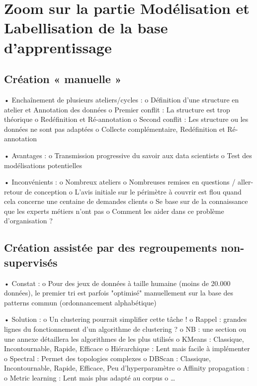     \section{Zoom sur la partie Modélisation et Labellisation de la base d'apprentissage}

        \subsection{Création « manuelle »}

            •	Enchaînement de plusieurs ateliers/cycles :
                o	Définition d’une structure en atelier et Annotation des données
                o	Premier conflit : La structure est trop théorique
                o	Redéfinition et Ré-annotation
                o	Second conflit : Les structure ou les données ne sont pas adaptées
                o	Collecte complémentaire, Redéfinition et Ré-annotation

            •	Avantages :
                o	Transmission progressive du savoir aux data scientists
                o	Test des modélisations potentielles

            •	Inconvénients :
                o	Nombreux ateliers
                o	Nombreuses remises en questions / aller-retour de conception
                o	L'avis initiale sur le périmètre à couvrir est flou quand cela concerne une centaine de demandes clients
                o	Se base sur de la connaissance que les experts métiers n’ont pas
                o	Comment les aider dans ce problème d’organisation ?

        \subsection{Création assistée par des regroupements non-supervisés}

            •	Constat :
                o	Pour des jeux de données à taille humaine (moins de 20.000 données), le premier tri est parfois "optimisé" manuellement sur la base des patterns commun (ordonnancement alphabétique)

            •	Solution :
                o	Un clustering pourrait simplifier cette tâche !
                o   Rappel : grandes lignes du fonctionnement d'un algorithme de \gls{clustering} ?
                o	NB : une section ou une annexe détaillera les algorithmes de  les plus utilisés					o	KMeans : Classique, Incontournable, Rapide, Efficace
					o	Hiérarchique : Lent mais facile à implémenter
					o	Spectral : Permet des topologies complexes
					o	DBScan : Classique, Incontournable, Rapide, Efficace, Peu d'hyperparamètre
					o	Affinity propagation : 
					o	Metric learning : Lent mais plus adapté au corpus
					o	…

